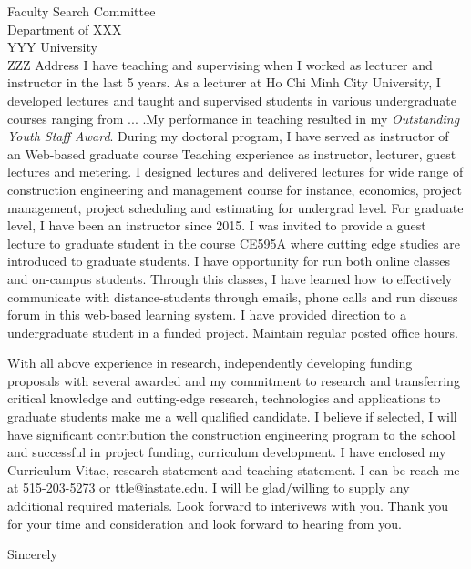 \documentclass{letter}
\begin{document}
\begin{letter} {Faculty Search Committee\\
Department of XXX\\
YYY University\\
ZZZ Address}
I have teaching and supervising when I worked as lecturer and instructor in the last 5 years. As a lecturer at Ho Chi Minh City University, I developed lectures and taught and supervised students in various undergraduate courses ranging from ... .My performance in teaching resulted in my {\sl Outstanding Youth Staff Award}.
%
During my doctoral program, I have served as instructor of an Web-based graduate course Teaching experience as instructor, lecturer, guest lectures and metering. I designed lectures and delivered lectures for wide range of construction engineering and management course for instance, economics, project management, project scheduling and estimating for undergrad level. For graduate level, I have been an instructor since 2015. I was invited to provide a guest lecture to graduate student in the course CE595A where cutting edge studies are introduced to graduate students. I have opportunity for run both online classes and on-campus students. Through this classes, I have learned how to effectively communicate with distance-students through emails, phone calls and run discuss forum in this web-based learning system. I have provided direction to a undergraduate student in a funded project. Maintain regular posted office hours. 


With all above experience in research, independently developing funding proposals with several awarded and my commitment to research and transferring critical knowledge and cutting-edge research, technologies and applications to graduate students make me a well qualified candidate. I believe if selected, I will have significant contribution the construction engineering program to the school and successful in project funding, curriculum development. I have enclosed my Curriculum Vitae, research statement and teaching statement. I can be reach me at 515-203-5273 or ttle@iastate.edu. I will be glad/willing to supply any additional required materials. Look forward to interivews with you. Thank you for your time and consideration and look forward to hearing from you.

\closing{Sincerely}



\end{letter}
\end{document}
